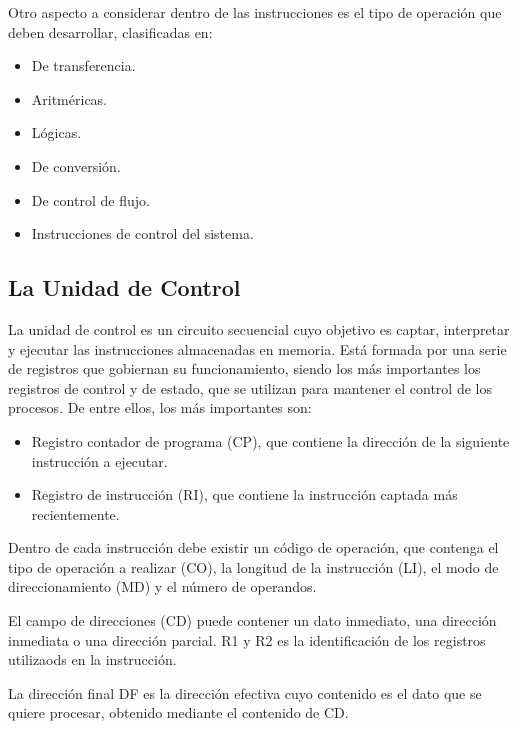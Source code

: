 \documentclass[a4paper, 11pt, titlepage]{article}
\begin{document}
            Otro aspecto a considerar dentro de las instrucciones es el tipo de operación que deben desarrollar, 
            clasificadas en:

            \begin{itemize}
                \item De transferencia.
                \item Aritméricas.
                \item Lógicas.
                \item De conversión.
                \item De control de flujo.
                \item Instrucciones de control del sistema.
            \end{itemize}

    \subsection{La Unidad de Control}\label{unidadcontrol}

        La unidad de control es un circuito secuencial cuyo objetivo es captar, interpretar y ejecutar 
        las instrucciones almacenadas en memoria. Está formada por una serie de registros que gobiernan 
        su funcionamiento, siendo los más importantes los registros de control y de estado, que se utilizan 
        para mantener el control de los procesos. De entre ellos, los más importantes son:

        \begin{itemize}
            \item Registro contador de programa (CP), que contiene la dirección de la siguiente instrucción 
            a ejecutar.
            \item Registro de instrucción (RI), que contiene la instrucción captada más recientemente.
        \end{itemize}

        Dentro de cada instrucción debe existir un código de operación, que contenga el tipo de operación a 
        realizar (CO), la longitud de la instrucción (LI), el modo de direccionamiento (MD) y el número de 
        operandos.

        El campo de direcciones (CD) puede contener un dato inmediato, una dirección inmediata o una dirección 
        parcial. R1 y R2 es la identificación de los registros utilizaods en la instrucción.

        La dirección final DF es la dirección efectiva cuyo contenido es el dato que se quiere procesar, obtenido
        mediante el contenido de CD.
\end{document}

